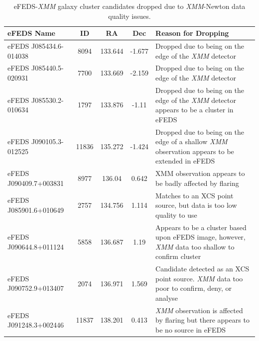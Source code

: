 \documentclass[fleqn,usenatbib]{mnras}
\begin{document}
\begin{table}
\begin{center}
\caption[]{{eFEDS-{\em XMM} galaxy cluster candidates dropped due to {\em XMM}-Newton data quality issues.}\label{tab:xmmrejects}}
\vspace{1mm}
\begin{tabular}{lccc|l}
\hline
\hline
eFEDS Name & ID & RA & Dec & Reason for Dropping\\
\hline
\hline
eFEDS J085434.6-014038 & 8094 & 133.644 & -1.677 & Dropped due to being on the edge of the {\em XMM} detector \\ 
\hline 
eFEDS J085440.5-020931 & 7700 & 133.669 & -2.159 & Dropped due to being on the edge of the {\em XMM} detector \\ 
\hline
eFEDS J085530.2-010634 & 1797 & 133.876 & -1.11 & Dropped due to being on the edge of the {\em XMM} detector appears to be a cluster in eFEDS \\ 
\hline 
eFEDS J090105.3-012525 & 11836 & 135.272 & -1.424 & Dropped due to being on the edge of a shallow {\em XMM} observation appears to be extended in eFEDS \\ 
\hline 
eFEDS J090409.7+003831 & 8977 & 136.04 & 0.642 & XMM observation appears to be badly affected by flaring \\ 
\hline
eFEDS J085901.6+010649 & 2757 & 134.756 & 1.114 & Matches to an XCS point source, but data is too low quality to use \\
\hline
eFEDS J090644.8+011124 & 5858 & 136.687 & 1.19 & Appears to be a cluster based upon eFEDS image, however, {\em XMM} data too shallow to confirm cluster \\
\hline
eFEDS J090752.9+013407 & 2074 & 136.971 & 1.569 & Candidate detected as an XCS point source. {\em XMM} data too poor to confirm, deny, or analyse\\ 
\hline 
eFEDS J091248.3+002446 & 11837 & 138.201 & 0.413 & {\em XMM} observation is affected by flaring but there appears to be no source in eFEDS \\ 
\hline 
\end{tabular}
\end{center}
\end{table}
\end{document}

